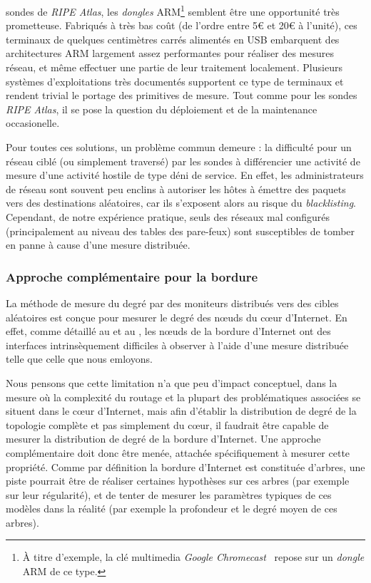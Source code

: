 \begin{itemize}
  sondes de {\em RIPE Atlas}, les {\em dongles} ARM\footnote{À titre d'exemple,
  la clé multimedia {\em Google Chromecast}~\cite{chromecast} repose sur un
  {\em dongle} ARM de ce type.} semblent être une opportunité très prometteuse.
  Fabriqués à très bas coût (de l'ordre entre 5€ et 20€ à l'unité), ces
  terminaux de quelques centimètres carrés alimentés en USB embarquent des architectures ARM largement assez
  performantes pour réaliser des mesures réseau, et même effectuer une partie
  de leur traitement localement. Plusieurs systèmes d'exploitations très
  documentés supportent ce type de terminaux et rendent trivial le portage des
  primitives de mesure. Tout comme pour les sondes {\em RIPE Atlas}, il se pose
  la question du déploiement et de la maintenance occasionelle.
\end{itemize}

Pour toutes ces solutions, un problème commun demeure : la difficulté pour un
réseau ciblé (ou simplement traversé) par les sondes \udpping à différencier une
activité de mesure d'une activité hostile de type déni de service. En effet, les
administrateurs de réseau sont souvent peu enclins à autoriser les hôtes à
émettre des paquets \udp vers des destinations aléatoires, car ils s'exposent
alors au risque du {\em blacklisting}. Cependant, de notre expérience pratique,
seuls des réseaux mal configurés (principalement au niveau des tables \udp des
pare-feux) sont susceptibles de tomber en panne à cause d'une mesure \udpping
distribuée.

\subsubsection{Approche complémentaire pour la bordure}

La méthode de mesure du degré par des moniteurs distribués vers des cibles
aléatoires est conçue pour mesurer le degré des n\oe{}uds du c\oe{}ur d'Internet.
En effet, comme détaillé au  et au , les
n\oe{}uds de la bordure d'Internet ont des interfaces intrinsèquement difficiles à
observer à l'aide d'une mesure distribuée telle que celle que nous emloyons.

Nous pensons que cette limitation n'a que peu d'impact conceptuel, dans la
mesure où la complexité du routage et la plupart des problématiques associées se
situent dans le c\oe{}ur d'Internet, mais afin d'établir la distribution de degré
de la topologie complète et pas simplement du c\oe{}ur, il faudrait être
capable de mesurer la distribution de degré de la bordure d'Internet. Une
approche complémentaire doit donc être menée, attachée spécifiquement à mesurer
cette propriété. Comme par définition la bordure d'Internet est constituée
d'arbres, une piste pourrait être de réaliser certaines hypothèses sur ces
arbres (par exemple sur leur régularité), et de tenter de mesurer les paramètres
typiques de ces modèles dans la réalité (par exemple la profondeur et le degré
moyen de ces arbres).

